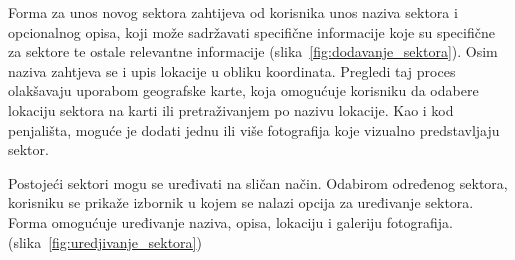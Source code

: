 Forma za unos novog sektora zahtijeva od korisnika unos naziva sektora i opcionalnog opisa, koji može sadržavati specifične informacije koje su specifične za sektore te ostale relevantne informacije (slika~\ref{fig:dodavanje_sektora}). Osim naziva zahtjeva se i upis lokacije u obliku koordinata. Pregledi taj proces olakšavaju uporabom geografske karte, koja omogućuje korisniku da odabere lokaciju sektora na karti ili pretraživanjem po nazivu lokacije. Kao i kod penjališta, moguće je dodati jednu ili više fotografija koje vizualno predstavljaju sektor.

Postojeći sektori mogu se uređivati na sličan način. Odabirom određenog sektora, korisniku se prikaže izbornik u kojem se nalazi opcija za uređivanje sektora. Forma omogućuje uređivanje  naziva, opisa, lokaciju i galeriju fotografija. (slika~\ref{fig:uredjivanje_sektora})

